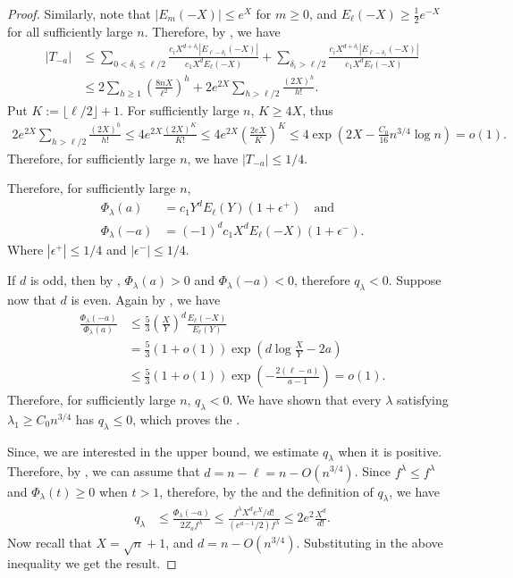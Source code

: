\documentclass[12pt]{article}
\theoremstyle{definition}
\newcommand{\1}{\mathbf 1}
\begin{document}
\begin{proof}
Similarly, note that $|E_m(-X)|\leq e^X$ for $m\geq 0$, and $E_\ell(-X)\geq \frac{1}{2}e^{-X}$ for all sufficiently large $n$. Therefore, by , we have
\begin{align*}
    |T_{-a}|&\leq \sum_{0<\delta_i\leq \ell/2} \frac{c_iX^{d+\delta_i}|E_{\ell-\delta_i}(-X)|}{c_1X^{d}E_{\ell}(-X)} + \sum_{\delta_i>\ell/2} \frac{c_iX^{d+\delta_i}|E_{\ell-\delta_i}(-X)|}{c_1X^{d}E_{\ell}(-X)}\\
    &\leq 2\sum_{h\geq 1}\left(\frac{8nX}{\ell^2}\right)^h+2e^{2X}\sum_{h>\ell/2}\frac{(2X)^h}{h!}.
\end{align*}
Put $K:=\lfloor\ell/2\rfloor+1$. For sufficiently large $n$, $K\geq 4X$, thus
\begin{align*}
    2e^{2X}\sum_{h>\ell/2}\frac{(2X)^h}{h!}\leq 4e^{2X}\frac{(2X)^K}{K!}\leq 4e^{2X}\left(\frac{2eX}{K}\right)^K\leq 4\exp\left(2X-\frac{C_0}{16}n^{3/4}\log n\right)=o(1).
\end{align*}
Therefore, for sufficiently large $n$, we have $|T_{-a}|\leq 1/4$.

Therefore, for sufficiently large $n$,
\begin{align}
    \Phi_{\lambda}(a)&=c_1Y^dE_{\ell}(Y)\left(1+\epsilon^+\right)\quad \text{and}\label{eq:phi_a}\\
    \Phi_{\lambda}(-a)&=(-1)^{d}c_1X^dE_{\ell}(-X)\left(1+\epsilon^-\right). \label{eq:phi_ma}  
\end{align}
Where $|\epsilon^+|\leq 1/4$ and $|\epsilon^-|\leq 1/4$.

If $d$ is odd, then by , $\Phi_{\lambda}(a)>0$ and $\Phi_{\lambda}(-a)<0$, therefore $q_{\lambda}<0$. Suppose now that $d$ is even. Again by  , we have
\begin{align*}
    \frac{\Phi_{\lambda}(-a)}{\Phi_{\lambda}(a)}&\leq \frac{5}{3}\left(\frac{X}{Y}\right)^d\frac{E_\ell(-X)}{E_\ell(Y)}\\
    &=\frac{5}{3}(1+o(1))\exp\left(d\log \frac{X}{Y}-2a\right)\\
    &\leq \frac{5}{3}(1+o(1))\exp\left(-\frac{2(\ell-a)}{a-1}\right)=o(1).
\end{align*}
Therefore, for sufficiently large $n$, $q_{\lambda}<0$. We have shown that every \(\lambda\) satisfying
\(\lambda_1\ge C_0n^{3/4}\) has \(q_\lambda\le0\), which proves the .


Since, we are interested in the upper bound, we estimate $q_\lambda$ when it is positive. Therefore, by , we can assume that $d=n-\ell=n-O(n^{3/4})$. Since $f^{\overline{\lambda}}\leq f^{\lambda}$ and $\Phi_{\lambda}(t)\geq 0$ when $t>1$, therefore, by the  and the  definition of $q_\lambda$, we have 
\begin{align*}
    q_\lambda&\leq \frac{\Phi_{\lambda}(-a)}{2Z_a f^{\lambda}} \leq \frac{f^{\overline{\lambda}}X^de^X/d!}{(e^{a-1}/2)f^{\lambda}} \leq 2e^2\frac{X^d}{d!}.
\end{align*}
Now recall that $X=\sqrt{n}+1$, and $d=n-O(n^{3/4})$. Substituting in the above inequality we get the result.
\end{proof}
\end{document}
